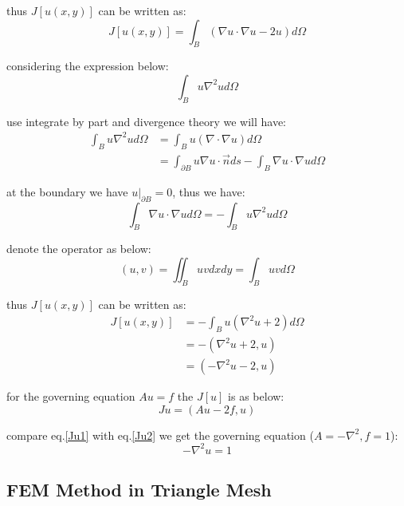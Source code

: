 thus $J[u(x,y)]$ can be written as:
\begin{equation}
    J[u(x,y)]=
    \int_B (\nabla u\cdot \nabla u - 2u)d\Omega
\end{equation}

considering the expression below:
$$
\int_B u\nabla^2u d\Omega
$$

use integrate by part and divergence theory we will have:
\begin{equation}
    \begin{aligned}
        \int_B u\nabla^2u d\Omega
        &=\int_B u(\nabla\cdot \nabla u)d\Omega\\
        &=\int_{\partial B} u\nabla u \cdot \vec{n} ds
        -
        \int_B \nabla u\cdot \nabla u d\Omega
    \end{aligned}
\end{equation}

at the boundary we have $u|_{\partial B} = 0$, thus we have:
\begin{equation}
    \int_B \nabla u\cdot \nabla u d\Omega
    =-
    \int_B u\nabla^2u d\Omega
\end{equation} 


denote the operator as below:
\begin{equation}
    (u,v) = \iint_B uv dxdy = \int_B uv d\Omega
\end{equation}

thus $J[u(x,y)]$ can be written as:
\begin{equation}
    \label{Ju1}
    \begin{aligned}
        J[u(x,y)]&=
    - \int_B u(\nabla^2 u + 2) d\Omega
    \\
    &=-(\nabla^2 u+2,u)\\
    &=(-\nabla^2 u -2, u)
    \end{aligned}
\end{equation}

for the governing equation $Au=f$ the $J[u]$ is as below:
\begin{equation}
    \label{Ju2}
    Ju = (Au-2f,u)
\end{equation}

compare eq.\ref{Ju1} with eq.\ref{Ju2} we get the governing equation ($A=-\nabla^2 , f=1$):
\begin{equation}
    -\nabla^2 u=1
\end{equation}

\subsection{FEM Method in Triangle Mesh}

